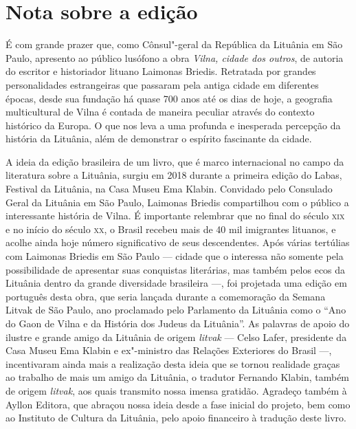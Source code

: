 \chapter[Nota sobre a edição, \textit{por Laura Tupe}]{Nota sobre a edição}

\noindent{}É com grande prazer que, como Cônsul"-geral da República da Lituânia em
São Paulo, apresento ao público lusófono a obra \textit{Vilna, cidade dos
outros}, de autoria do escritor e historiador lituano Laimonas Briedis.
Retratada por grandes personalidades estrangeiras que passaram pela
antiga cidade em diferentes épocas, desde sua fundação há quase 700 anos
até os dias de hoje, a geografia multicultural de Vilna é contada
de maneira peculiar através do contexto histórico da Europa. O que nos
leva a uma profunda e inesperada percepção da história da Lituânia, 
além de demonstrar o espírito fascinante da cidade.

A ideia da edição brasileira de um livro, que é marco internacional no
campo da literatura sobre a Lituânia, surgiu em 2018 durante a primeira
edição do Labas, Festival da Lituânia, na Casa Museu Ema Klabin.
Convidado pelo Consulado Geral da Lituânia em São Paulo, Laimonas
Briedis compartilhou com o público a interessante história de Vilna. É
importante relembrar que no final do século \textsc{xix} e no início do século
\textsc{xx}, o Brasil recebeu mais de 40 mil imigrantes lituanos, e acolhe ainda
hoje número significativo de seus descendentes. Após várias tertúlias
com Laimonas Briedis em São Paulo --- cidade que o interessa não somente
pela possibilidade de apresentar suas conquistas literárias, mas também
pelos ecos da Lituânia dentro da grande diversidade brasileira ---, foi
projetada uma edição em português desta obra, que seria lançada durante
a comemoração da Semana Litvak de São Paulo, ano proclamado pelo
Parlamento da Lituânia como o ``Ano do Gaon de Vilna e da História
dos Judeus da Lituânia''. As palavras de apoio do ilustre e grande amigo
da Lituânia de origem \textit{litvak} --- Celso Lafer, presidente da
Casa Museu Ema Klabin e ex"-ministro das Relações Exteriores do Brasil ---,
incentivaram ainda mais a realização desta ideia que se tornou realidade
graças ao trabalho de mais um amigo da Lituânia, o tradutor Fernando
Klabin, também de origem \textit{litvak}, aos quais transmito nossa imensa
gratidão. Agradeço também à Ayllon Editora, que abraçou nossa ideia
desde a fase inicial do projeto, bem como ao Instituto de Cultura da
Lituânia, pelo apoio financeiro à tradução deste livro.

